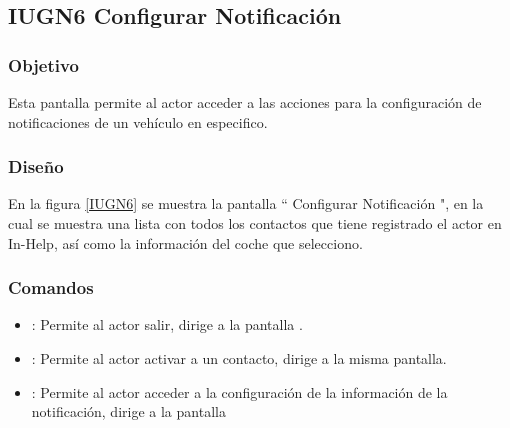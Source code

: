 \subsection{IUGN6 Configurar Notificación}

\subsubsection{Objetivo}

	
    Esta pantalla permite al actor acceder a las acciones para la configuración de notificaciones de un vehículo en especifico.

\subsubsection{Diseño}


    En la figura \ref{IUGN6} se muestra la pantalla `` Configurar Notificación ", en la cual se muestra una lista con todos los contactos que tiene registrado el actor en In-Help, así como la información del coche que selecciono.\\

\subsubsection{Comandos}
    \begin{itemize}
    	\item \btnRegresar[Regresar]: Permite al actor salir, dirige a la pantalla .
    	\item {}: Permite al actor activar a un contacto, dirige a la misma pantalla.
    	\item \btnGestionar[Configurar]: Permite al actor acceder a la configuración de la información de la notificación, dirige a la pantalla  
    \end{itemize}

